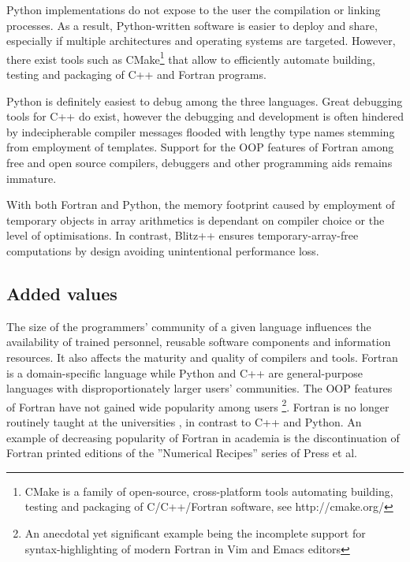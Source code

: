 \documentclass[review,peprint,10pt,5p,times]{elsarticle}
\newcommand{\url}[1]{{#1}}
\begin{document}
  Python implementations do not expose to the user the compilation or linking processes. 
  As a result, Python-written software is easier to deploy and share, especially 
    if multiple architectures and operating systems are targeted.
  However, there exist tools such as CMake\footnote{CMake is a family of open-source, cross-platform
    tools automating building, testing and packaging of C/C++/Fortran software,
    see \url{http://cmake.org/}}
    that allow to efficiently automate 
    building, testing and packaging of C++ and Fortran programs.

  Python is definitely easiest to debug among the three languages.
  Great debugging tools for C++ do exist, however the debugging and development is 
    often hindered by indecipherable compiler messages
    flooded with lengthy type names stemming from employment of templates.
  Support for the OOP features of Fortran among free and open source compilers, 
    debuggers and other programming aids remains immature.
    
  With both Fortran and Python, the memory footprint caused by employment
    of temporary objects in array arithmetics is dependant on compiler choice or
    the level of optimisations.
  In contrast, Blitz++ ensures temporary-array-free computations by design
    \citep{Veldhuizen_et_al_1997} avoiding unintentional performance loss.

  \subsection{Added values}

  The size of the programmers' community of a given language 
    influences the availability of trained personnel, 
    reusable software components and information resources.
  It also affects the maturity and quality of compilers and tools. 
  Fortran is a domain-specific language while Python and C++ are general-purpose languages
    with disproportionately larger users' communities.
  The OOP features of Fortran have not gained
    wide popularity among users \citep{Worth_2008}\footnote{An anecdotal yet significant
    example being the incomplete support for syntax-highlighting of modern Fortran in Vim and Emacs editors}.
  Fortran is no longer routinely taught at the universities \citep{Kendall_et_al_2008},
    in contrast to C++ and Python.
  An example of decreasing popularity of Fortran in academia 
    is the discontinuation of Fortran printed editions of the ''Numerical Recipes'' 
    series of Press et al.
 
\end{document}
